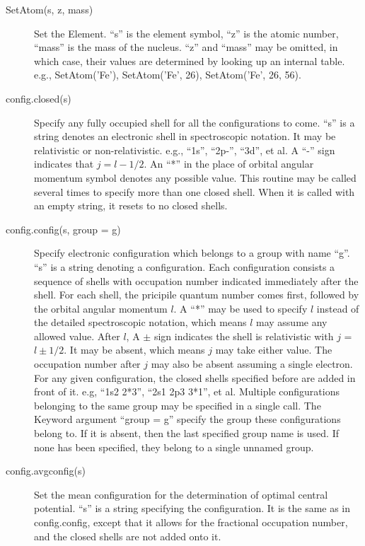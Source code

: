 \documentclass[12pt]{article}
\begin{document}
\begin{description}
\item[SetAtom(s, z, mass)] 
Set the Element. ``s'' is the element symbol, ``z'' is
the atomic number, ``mass'' is the mass of the nucleus. ``z'' and ``mass'' may
be omitted, in which case, their values are determined by looking up an
internal table. e.g., SetAtom('Fe'), SetAtom('Fe', 26), SetAtom('Fe', 26, 56).

\item[config.closed(s)] 
Specify any fully occupied shell for all the
configurations to come. ``s'' is a string denotes an electronic shell in
spectroscopic notation. It may be relativistic or non-relativistic. e.g., 
``1s'', ``2p-'', ``3d'', et al. A ``-'' sign indicates that $j = l - 1/2$. 
An ``*'' in the place of orbital angular momentum symbol denotes any possible
value. This routine may be called several times to specify more than one closed
shell. When it is called with an empty string, it resets to no closed shells. 

\item[config.config(s, group = g)] 
Specify electronic configuration which
belongs to a group with name ``g''. ``s'' is a string denoting a
configuration. Each configuration consists a sequence of shells with
occupation number indicated immediately after the shell. For each shell, the
pricipile quantum 
number comes first, followed by the orbital angular momentum $l$. A ``*'' may
be used to specify $l$ instead of the detailed spectroscopic notation, which
means $l$ may assume any allowed value. After $l$,  A $\pm$ sign
indicates the shell is relativistic with $j$ = $l\pm 1/2$. It may be absent,
which means $j$ may take either value. The occupation number after $j$ may
also be absent assuming a single electron. For any given configuration, the
closed shells specified before are added in front of it. e.g, ``1s2 2*3'', 
``2s1 2p3 3*1'', et al. Multiple configurations belonging to the same group
may be specified in a single call. The Keyword argument ``group = g'' specify
the group these configurations belong to. If it is absent, 
then the last specified group name is used. If none has been specified, they
belong to a single unnamed group. 

\item[config.avgconfig(s)]
Set the mean configuration for the determination of optimal central
potential. ``s'' is a string specifying the configuration. It is the same as
in config.config, except that it allows for the fractional occupation number,
and the closed shells are not added onto it. 


\end{description}
\end{document}
